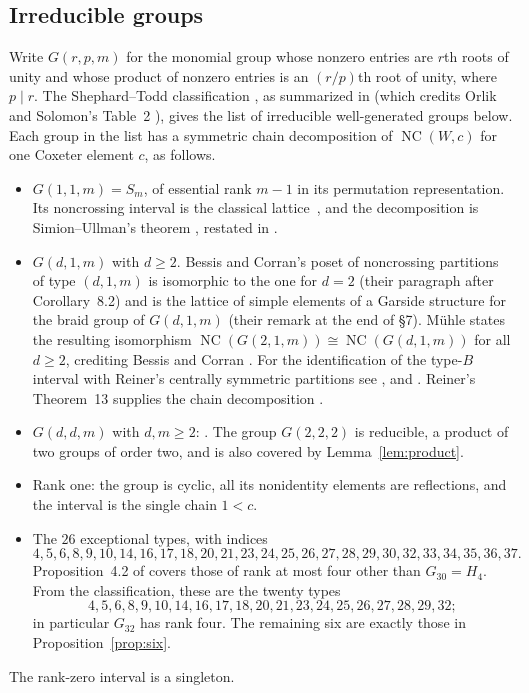 \documentclass[11pt]{article}
\theoremstyle{definition}
\newcommand{\NC}{\operatorname{NC}}
\begin{document}
\subsection{Irreducible groups}
Write $G(r,p,m)$ for the monomial group whose nonzero entries are
$r$th roots of unity and whose product of nonzero entries is an
$(r/p)$th root of unity, where $p\mid r$. The Shephard--Todd
classification \cite{ST}, as summarized in \cite[\S2.2]{Muhle} (which
credits Orlik and Solomon's Table~2 \cite{OS1980}), gives the list of
irreducible well-generated groups below.
Each group in the list has a symmetric chain decomposition of
$\NC(W,c)$ for one Coxeter element $c$, as follows.
\begin{itemize}
\item $G(1,1,m)=S_m$, of essential rank $m-1$ in its permutation
  representation. Its noncrossing interval is the classical
  lattice~\cite[Section~4.1]{BessisDual}, and the decomposition is
  Simion--Ullman's theorem \cite[Theorem~2]{SU}, restated in
  \cite[Theorem~3.6 and Corollary~3.7]{Muhle}.
\item $G(d,1,m)$ with $d\geq2$. Bessis and Corran's poset of
  noncrossing partitions of type $(d,1,m)$ \cite[Definition~1.11]{BC}
  is isomorphic to the one for $d=2$ (their paragraph after
  Corollary~8.2) and is the lattice of simple elements of a Garside
  structure for the braid group of $G(d,1,m)$ (their remark at the end
  of \S7). M\"uhle states the resulting
  isomorphism $\NC(G(2,1,m))\cong\NC(G(d,1,m))$ for all $d\geq2$,
  crediting Bessis and Corran
  \cite[introduction, paragraph before Theorem~1.3]{Muhle}. For the
  identification of the type-$B$ interval with Reiner's centrally
  symmetric partitions see \cite[Theorem~4.9]{BW},
  \cite[Section~4.2]{BessisDual} and
  \cite[Section~1.4, after Lemma~1.12]{BC}. Reiner's Theorem~13
  supplies the chain decomposition \cite{Reiner}.
\item $G(d,d,m)$ with $d,m\geq2$: \cite[Theorem~1.3]{Muhle}. The group
  $G(2,2,2)$ is reducible, a product of two groups of order two, and is
  also covered by Lemma~\ref{lem:product}.
\item Rank one: the group is cyclic, all its nonidentity elements are
  reflections, and the interval is the single chain $1<c$.
\item The $26$ exceptional types, with indices
\[
 4,5,6,8,9,10,14,16,17,18,20,21,23,24,25,26,27,28,29,30,
 32,33,34,35,36,37.
\]
Proposition~4.2 of \cite{Muhle} covers those of rank at most four
other than $G_{30}=H_4$. From the classification, these are the twenty
types
\[
 4,5,6,8,9,10,14,16,17,18,20,21,23,24,25,26,27,28,29,32;
\]
in particular $G_{32}$ has rank four. The remaining six are exactly
those in Proposition~\ref{prop:six}.
\end{itemize}
The rank-zero interval is a singleton.
\end{document}
